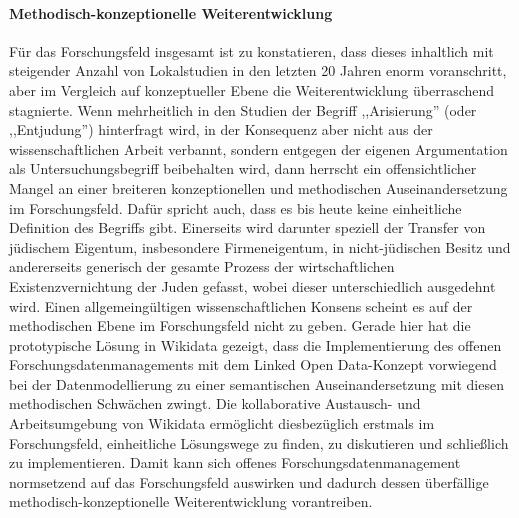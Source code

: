\paragraph{Methodisch-konzeptionelle Weiterentwicklung} Für das Forschungsfeld insgesamt ist zu konstatieren, dass dieses inhaltlich mit steigender Anzahl von Lokalstudien in den letzten 20 Jahren enorm voranschritt, aber im Vergleich auf konzeptueller Ebene die Weiterentwicklung überraschend stagnierte. Wenn mehrheitlich in den Studien der Begriff ,,Arisierung'' (oder ,,Entjudung'') hinterfragt wird, in der Konsequenz aber nicht aus der wissenschaftlichen Arbeit verbannt, sondern entgegen der eigenen Argumentation als Untersuchungsbegriff beibehalten wird, dann herrscht ein offensichtlicher Mangel an einer breiteren konzeptionellen und methodischen Auseinandersetzung im Forschungsfeld. Dafür spricht auch, dass es bis heute keine einheitliche Definition des Begriffs gibt. Einerseits wird darunter speziell der Transfer von jüdischem Eigentum, insbesondere Firmeneigentum, in nicht-jüdischen Besitz und andererseits generisch der gesamte Prozess der wirtschaftlichen Existenzvernichtung der Juden gefasst, wobei dieser unterschiedlich ausgedehnt wird. Einen allgemeingültigen wissenschaftlichen Konsens scheint es auf der methodischen Ebene im Forschungsfeld nicht zu geben. Gerade hier hat die prototypische Lösung in Wikidata gezeigt, dass die Implementierung des offenen Forschungsdatenmanagements mit dem Linked Open Data-Konzept vorwiegend bei der Datenmodellierung zu einer semantischen Auseinandersetzung mit diesen methodischen Schwächen zwingt. Die kollaborative Austausch- und Arbeitsumgebung von Wikidata ermöglicht diesbezüglich erstmals im Forschungsfeld, einheitliche Lösungswege zu finden, zu diskutieren und schließlich zu implementieren. Damit kann sich offenes Forschungsdatenmanagement normsetzend auf das Forschungsfeld auswirken und dadurch dessen überfällige methodisch-konzeptionelle Weiterentwicklung vorantreiben. 

